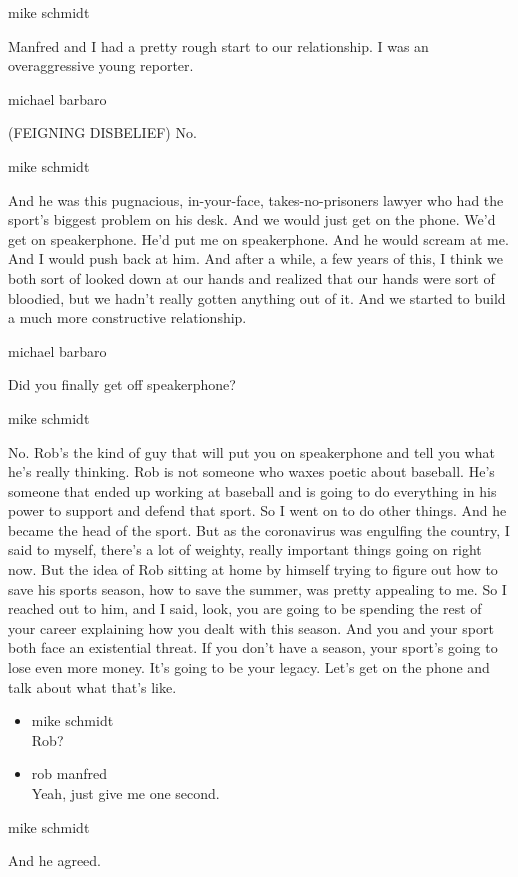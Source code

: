 mike schmidt

Manfred and I had a pretty rough start to our relationship. I was an
overaggressive young reporter.

michael barbaro

(FEIGNING DISBELIEF) No.

mike schmidt

And he was this pugnacious, in-your-face, takes-no-prisoners lawyer who
had the sport's biggest problem on his desk. And we would just get on
the phone. We'd get on speakerphone. He'd put me on speakerphone. And he
would scream at me. And I would push back at him. And after a while, a
few years of this, I think we both sort of looked down at our hands and
realized that our hands were sort of bloodied, but we hadn't really
gotten anything out of it. And we started to build a much more
constructive relationship.

michael barbaro

Did you finally get off speakerphone?

mike schmidt

No. Rob's the kind of guy that will put you on speakerphone and tell you
what he's really thinking. Rob is not someone who waxes poetic about
baseball. He's someone that ended up working at baseball and is going to
do everything in his power to support and defend that sport. So I went
on to do other things. And he became the head of the sport. But as the
coronavirus was engulfing the country, I said to myself, there's a lot
of weighty, really important things going on right now. But the idea of
Rob sitting at home by himself trying to figure out how to save his
sports season, how to save the summer, was pretty appealing to me. So I
reached out to him, and I said, look, you are going to be spending the
rest of your career explaining how you dealt with this season. And you
and your sport both face an existential threat. If you don't have a
season, your sport's going to lose even more money. It's going to be
your legacy. Let's get on the phone and talk about what that's like.

\begin{itemize}
\item
  mike schmidt\\
  Rob?
\item
  rob manfred\\
  Yeah, just give me one second.
\end{itemize}

mike schmidt

And he agreed.

